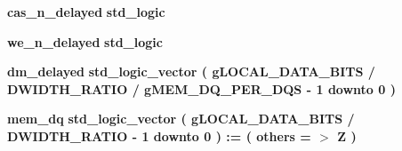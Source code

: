 \begin{DoxyCompactItemize}
{\bf cas\+\_\+n\+\_\+delayed} {\bfseries \textcolor{comment}{std\+\_\+logic}\textcolor{vhdlchar}{ }} 
\item 
{\bf we\+\_\+n\+\_\+delayed} {\bfseries \textcolor{comment}{std\+\_\+logic}\textcolor{vhdlchar}{ }} 
\item 
{\bf dm\+\_\+delayed} {\bfseries \textcolor{comment}{std\+\_\+logic\+\_\+vector}\textcolor{vhdlchar}{ }\textcolor{vhdlchar}{(}\textcolor{vhdlchar}{ }\textcolor{vhdlchar}{ }\textcolor{vhdlchar}{ }\textcolor{vhdlchar}{ }{\bfseries {\bf g\+L\+O\+C\+A\+L\+\_\+\+D\+A\+T\+A\+\_\+\+B\+I\+TS}} \textcolor{vhdlchar}{/}\textcolor{vhdlchar}{ }\textcolor{vhdlchar}{ }\textcolor{vhdlchar}{ }{\bfseries {\bf D\+W\+I\+D\+T\+H\+\_\+\+R\+A\+T\+IO}} \textcolor{vhdlchar}{/}\textcolor{vhdlchar}{ }\textcolor{vhdlchar}{ }\textcolor{vhdlchar}{ }{\bfseries {\bf g\+M\+E\+M\+\_\+\+D\+Q\+\_\+\+P\+E\+R\+\_\+\+D\+QS}} \textcolor{vhdlchar}{-\/}\textcolor{vhdlchar}{ } \textcolor{vhdldigit}{1} \textcolor{vhdlchar}{ }\textcolor{keywordflow}{downto}\textcolor{vhdlchar}{ }\textcolor{vhdlchar}{ } \textcolor{vhdldigit}{0} \textcolor{vhdlchar}{ }\textcolor{vhdlchar}{)}\textcolor{vhdlchar}{ }} 
\item 
{\bf mem\+\_\+dq} {\bfseries \textcolor{comment}{std\+\_\+logic\+\_\+vector}\textcolor{vhdlchar}{ }\textcolor{vhdlchar}{(}\textcolor{vhdlchar}{ }\textcolor{vhdlchar}{ }\textcolor{vhdlchar}{ }\textcolor{vhdlchar}{ }{\bfseries {\bf g\+L\+O\+C\+A\+L\+\_\+\+D\+A\+T\+A\+\_\+\+B\+I\+TS}} \textcolor{vhdlchar}{/}\textcolor{vhdlchar}{ }\textcolor{vhdlchar}{ }\textcolor{vhdlchar}{ }{\bfseries {\bf D\+W\+I\+D\+T\+H\+\_\+\+R\+A\+T\+IO}} \textcolor{vhdlchar}{-\/}\textcolor{vhdlchar}{ } \textcolor{vhdldigit}{1} \textcolor{vhdlchar}{ }\textcolor{keywordflow}{downto}\textcolor{vhdlchar}{ }\textcolor{vhdlchar}{ } \textcolor{vhdldigit}{0} \textcolor{vhdlchar}{ }\textcolor{vhdlchar}{)}\textcolor{vhdlchar}{ }\textcolor{vhdlchar}{ }\textcolor{vhdlchar}{ }\textcolor{vhdlchar}{\+:}\textcolor{vhdlchar}{=}\textcolor{vhdlchar}{ }\textcolor{vhdlchar}{(}\textcolor{vhdlchar}{ }\textcolor{vhdlchar}{ }\textcolor{keywordflow}{others}\textcolor{vhdlchar}{ }\textcolor{vhdlchar}{ }\textcolor{vhdlchar}{=}\textcolor{vhdlchar}{ }\textcolor{vhdlchar}{$>$}\textcolor{vhdlchar}{ }\textcolor{vhdlchar}{\textquotesingle{}}\textcolor{vhdlchar}{ }\textcolor{vhdlchar}{Z}\textcolor{vhdlchar}{ }\textcolor{vhdlchar}{\textquotesingle{}}\textcolor{vhdlchar}{ }\textcolor{vhdlchar}{)}\textcolor{vhdlchar}{ }} 
\item 

\end{DoxyCompactItemize}
